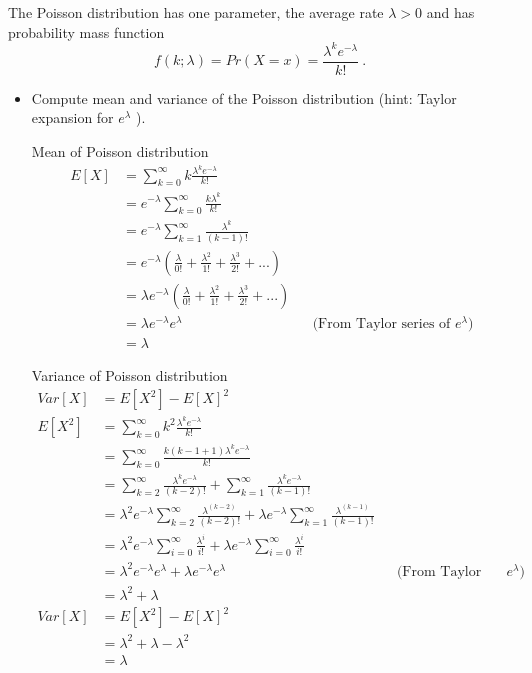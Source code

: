 \documentclass{article}
\begin{document}
The Poisson distribution has one parameter, the average rate $\lambda>0$ and has probability mass function
\[
f(k; \lambda) = Pr(X = x) = \frac{\lambda^k e^{-\lambda}}{k!}~.
\]
\begin{itemize}
\item Compute mean and variance of the Poisson distribution (hint: Taylor expansion for $e^{\lambda}$ ).

\begin{mdframed}[backgroundcolor=lightgray]
Mean of Poisson distribution
\begin{align*}
E[X] &= \sum_{k=0}^\infty k  \frac{\lambda^k e^{-\lambda}}{k!} \\
&= e^{-\lambda} \sum_{k=0}^\infty \frac{k \lambda^k}{k!}\\
&= e^{-\lambda} \sum_{k=1}^\infty \frac{\lambda^k}{(k-1)!}\\
&= e^{-\lambda} \left(\frac{\lambda}{0!} + \frac{\lambda^2}{1!} + \frac{\lambda^3}{2!} + ...\right) \\
&= \lambda e^{-\lambda} \left(\frac{\lambda}{0!} + \frac{\lambda^2}{1!} + \frac{\lambda^3}{2!} + ...\right)\\
&= \lambda e^{-\lambda} e^{\lambda} && \text{(From Taylor series of ${e^{\lambda}}$)}\\
&= \lambda
\end{align*}

Variance of Poisson distribution
\begin{align*}
Var[X] &= E[X^2] - E[X]^2\\
E[X^2] &= \sum_{k=0}^\infty k^2  \frac{\lambda^k e^{-\lambda}}{k!}\\
&= \sum_{k=0}^\infty \frac{k(k-1+1) \lambda^k e^{-\lambda}}{k!}\\
&= \sum_{k=2}^\infty \frac{\lambda^k e^{-\lambda}}{(k-2)!} + \sum_{k=1}^\infty \frac{\lambda^k e^{-\lambda}}{(k-1)!}\\
&= \lambda^2 e^{-\lambda} \sum_{k=2}^\infty \frac{\lambda^{(k-2)}}{(k-2)!} + \lambda e^{-\lambda} \sum_{k=1}^\infty \frac{\lambda^{(k-1)}}{(k-1)!}\\
&= \lambda^2 e^{-\lambda} \sum_{i=0}^\infty \frac{\lambda^{i}}{i!} + \lambda e^{-\lambda} \sum_{i=0}^\infty \frac{\lambda^{i}}{i!}\\
&= \lambda^2 e^{-\lambda} e^{\lambda} + \lambda e^{-\lambda} e^{\lambda} && \text{(From Taylor series of ${e^{\lambda}}$)}\\
&= \lambda^2 + \lambda\\
Var[X] &= E[X^2] - E[X]^2\\
&= \lambda^2 + \lambda - \lambda^2\\
&= \lambda
\end{align*} 
\end{mdframed}


\end{itemize}
\end{document}
